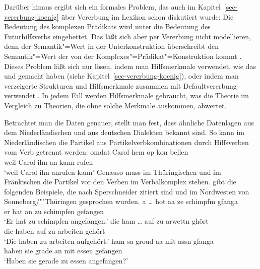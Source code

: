 Darüber hinaus ergibt sich ein formales Problem, das auch im Kapitel~\ref{sec-vererbung-koenig} 
über Vererbung im Lexikon schon diskutiert wurde: Die Bedeutung des komplexen Prädikats wird unter
die Bedeutung des Futurhilfsverbs eingebettet. Das läßt sich aber per Vererbung nicht modellieren,
denn der Semantik"=Wert in der Unterkonstruktion überschreibt den Semantik"=Wert der von der
Komplexes"=Prädikat"=Konstruktion kommt \citep[Abschnitt~4.2]{MuellerPersian}. Dieses Problem läßt sich nur lösen, indem man Hilfsmerkmale
verwendet, wie das \citet[]{Kathol94a} und \citet{Koenig99a} gemacht haben (siehe Kapitel~\ref{sec-vererbung-koenig}),
oder indem man verzeigerte Strukturen und Hilfsmerkmale zusammen mit Defaultvererbung verwendet 
\citep{MuellerDefaults}. In jedem Fall werden Hilfsmerkmale gebraucht, was die Theorie im Vergleich
zu Theorien, die ohne solche Merkmale auskommen, abwertet.

Betrachtet man die Daten genauer, stellt man fest, dass ähnliche Datenlagen aus dem Niederländischen
und aus deutschen Dialekten bekannt sind. So kann im Niederländischen
die Partikel aus Partikelverbkombinationen
durch Hilfsverben vom Verb getrennt werden:
\ea
\gll omdat Carol hem op kon  bellen\footnotemark\\
     weil  Carol ihn an kann rufen\\
\glt `weil Carol ihn anrufen kann'
\z
Genauso muss im Thüringischen und im Fränkischen die Partikel vor den
Verben im Verbalkomplex stehen. \citet*[]{Werner94a} gibt die folgenden Beispiele,
die nach Sperschneider zitiert sind
und im Nordwesten von Sonneberg/""Thüringen gesprochen wurden.
\eal
\label{ex-sonneberg-partikel-phasen}
\ex{}
\gll a  \ldots{} hot aa   ze schimpfm  gfanga\\
     er {}       hat an   zu schimpfen gefangen\\
\glt `Er hat zu schimpfen angefangen.'
\ex{}
\gll die  ham  \ldots{}  auf  zu arwettn ghört\\
     die haben {}        auf  zu arbeiten gehört\\
\glt `Die haben zu arbeiten aufgehört.'
\ex
\gll ham   sa  groud  aa mit assn  gfanga\\
     haben sie grade  an mit essen gefangen\\
\glt `Haben sie gerade zu essen angefangen?'
\zl

